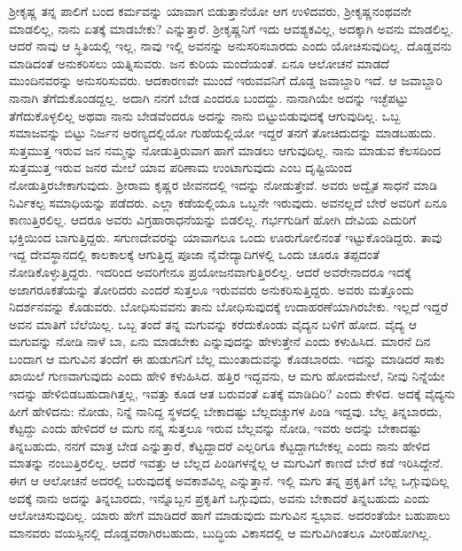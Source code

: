 ಶ‍್ರೀಕೃಷ್ಣ ತನ್ನ ಪಾಲಿಗೆ ಬಂದ ಕರ್ಮವನ್ನು ಯಾವಾಗ ಬಿಡುತ್ತಾನೆಯೋ ಆಗ ಉಳಿದವರು, ಶ‍್ರೀಕೃಷ್ಣನಂಥವನೇ ಮಾಡಲಿಲ್ಲ, ನಾನು ಏತಕ್ಕೆ ಮಾಡಬೇಕು? ಎನ್ನುತ್ತಾರೆ. ಶ‍್ರೀಕೃಷ್ಣನಿಗೆ ಇದು ಆವಶ್ಯಕವಿಲ್ಲ, ಅದಕ್ಕಾಗಿ ಅವನು ಮಾಡಲಿಲ್ಲ. ಆದರೆ ನಾವು ಆ ಸ್ಥಿತಿಯಲ್ಲಿ ಇಲ್ಲ, ನಾವು ಇಲ್ಲಿ ಅವನನ್ನು ಅನುಸರಿಸಬಾರದು ಎಂದು ಯೋಚಿಸುವುದಿಲ್ಲ. ದೊಡ್ಡವನು ಮಾಡಿದಂತೆ ಅನುಕರಿಸಲು ಯತ್ನಿಸುವರು. ಜನ ಕುರಿಯ ಮಂದೆಯಂತೆ. ಏನೂ ಆಲೋಚನೆ ಮಾಡದೆ ಮುಂದಿನವರನ್ನು ಅನುಸರಿಸುವರು. ಆದಕಾರಣವೇ ಮುಂದೆ ಇರುವವನಿಗೆ ದೊಡ್ಡ ಜವಾಬ್ದಾರಿ ಇದೆ. ಆ ಜವಾಬ್ದಾರಿ ನಾನಾಗಿ ತೆಗೆದುಕೊಂಡದ್ದಲ್ಲ. ಅದಾಗಿ ನನಗೆ ಬೇಡ ಎಂದರೂ ಬಂದದ್ದು. ನಾನಾಗಿಯೇ ಅದನ್ನು ಇಚ್ಛೆಪಟ್ಟು ತೆಗೆದುಕೊಳ್ಳಲಿಲ್ಲ ಅಥವಾ ನಾನು ಬೇಡವೆಂದರೂ ಅದನ್ನು ನಾನು ಬಿಟ್ಟುಬಿಡುವುದಕ್ಕೆ ಆಗುವುದಿಲ್ಲ. ಒಬ್ಬ ಸಮಾಜವನ್ನು ಬಿಟ್ಟು ನಿರ್ಜನ ಅರಣ್ಯದಲ್ಲಿಯೋ ಗುಹೆಯಲ್ಲಿಯೋ ಇದ್ದರೆ ತನಗೆ ತೋಚಿದುದನ್ನು ಮಾಡಬಹುದು. ಸುತ್ತಮುತ್ತ ಇರುವ ಜನ ನಮ್ಮನ್ನು ನೋಡುತ್ತಿರುವಾಗ ಹಾಗೆ ಮಾಡಲು ಆಗುವುದಿಲ್ಲ. ನಾನು ಮಾಡುವ ಕೆಲಸದಿಂದ ಸುತ್ತಮುತ್ತ ಇರುವ ಜನರ ಮೇಲೆ ಯಾವ ಪರಿಣಾಮ ಉಂಟಾಗುವುದು ಎಂಬ ದೃಷ್ಟಿಯಿಂದ ನೋಡುತ್ತಿರಬೇಕಾಗುವುದು. ಶ‍್ರೀರಾಮ ಕೃಷ್ಣರ ಜೀವನದಲ್ಲಿ ಇದನ್ನು ನೋಡುತ್ತೇವೆ. ಅವರು ಅದ್ವೈತ ಸಾಧನೆ ಮಾಡಿ ನಿರ್ವಿಕಲ್ಪ ಸಮಾಧಿಯನ್ನು ಪಡೆದರು. ಎಲ್ಲಾ ಕಡೆಯಲ್ಲಿಯೂ ಒಬ್ಬನೇ ಇರುವುದು. ಅವನಲ್ಲದೆ ಬೇರೆ ಅವರಿಗೆ ಏನೂ ಕಾಣುತ್ತಿರಲಿಲ್ಲ. ಆದರೂ ಅವರು ವಿಗ್ರಹಾರಾಧನೆಯನ್ನು ಬಿಡಲಿಲ್ಲ. ಗರ್ಭಗುಡಿಗೆ ಹೋಗಿ ದೇವಿಯ ಎದುರಿಗೆ ಭಕ್ತಿಯಿಂದ ಬಾಗುತ್ತಿದ್ದರು. ಸಗುಣದೇವರನ್ನು ಯಾವಾಗಲೂ ಒಂದು ಊರುಗೋಲಿನಂತೆ ಇಟ್ಟುಕೊಂಡಿದ್ದರು. ತಾವು ಇದ್ದ ದೇವಸ್ಥಾನದಲ್ಲಿ ಕಾಲಕಾಲಕ್ಕೆ ಆಗುತ್ತಿದ್ದ ಪೂಜಾ ನೈವೇದ್ಯಾದಿಗಳಲ್ಲಿ ಒಂದು ಚೂರೂ ತಪ್ಪದಂತೆ ನೋಡಿಕೊಳ್ಳುತ್ತಿದ್ದರು. ಇದರಿಂದ ಅವರಿಗೇನೂ ಪ್ರಯೋಜನವಾಗುತ್ತಿರಲಿಲ್ಲ. ಆದರೆ ಅವರೇನಾದರೂ ಇದಕ್ಕೆ ಅಜಾಗರೂಕತೆಯನ್ನು ತೋರಿದರು ಎಂದರೆ ಸುತ್ತಲೂ ಇರುವವರು ಅನುಕರಿಸುತ್ತಿದ್ದರು. ಅವರು ಮತ್ತೊಂದು ನಿದರ್ಶನವನ್ನು ಕೊಡುವರು. ಬೋಧಿಸುವವನು ತಾನು ಬೋಧಿಸುವುದಕ್ಕೆ ಉದಾಹರಣೆಯಾಗಿರಬೇಕು. ಇಲ್ಲದೆ ಇದ್ದರೆ ಅವನ ಮಾತಿಗೆ ಬೆಲೆಯಿಲ್ಲ. ಒಬ್ಬ ತಂದೆ ತನ್ನ ಮಗುವನ್ನು ಕರೆದುಕೊಂಡು ವೈದ್ಯನ ಬಳಿಗೆ ಹೋದ. ವೈದ್ಯ ಆ ಮಗುವನ್ನು ನೋಡಿ ನಾಳೆ ಬಾ, ಏನು ಮಾಡಬೇಕು ಎನ್ನುವುದನ್ನು ಹೇಳುತ್ತೇನೆ ಎಂದು ಕಳುಹಿಸಿದ. ಮಾರನೆ ದಿನ ಬಂದಾಗ ಆ ಮಗುವಿನ ತಂದೆಗೆ ಈ ಹುಡುಗನಿಗೆ ಬೆಲ್ಲ ಮುಂತಾದುವನ್ನು ಕೊಡಬಾರದು. ಇದನ್ನು ಮಾಡಿದರೆ ಸಾಕು ಖಾಯಿಲೆ ಗುಣವಾಗುವುದು ಎಂದು ಹೇಳಿ ಕಳುಹಿಸಿದ. ಹತ್ತಿರ ಇದ್ದವನು, ಆ ಮಗು ಹೋದಮೇಲೆ, ನೀವು ನಿನ್ನೆಯೇ ಇದನ್ನು ಹೇಳಿಬಿಡಬಹುದಾಗಿತ್ತಲ್ಲ, ಇವತ್ತು ಕೂಡ ಆತ ಬರುವಂತೆ ಏತಕ್ಕೆ ಮಾಡಿದಿರಿ? ಎಂದು ಕೇಳಿದ. ಅದಕ್ಕೆ ವೈದ್ಯನು ಹೀಗೆ ಹೇಳಿದನು: ನೋಡು, ನಿನ್ನೆ ನಾನಿದ್ದ ಸ್ಥಳದಲ್ಲಿ ಬೇಕಾದಷ್ಟು ಬೆಲ್ಲದಚ್ಚುಗಳ ಪಿಂಡಿ ಇದ್ದವು. ಬೆಲ್ಲ ತಿನ್ನಬಾರದು, ಕೆಟ್ಟದ್ದು ಎಂದು ಹೇಳಿದರೆ ಆ ಮಗು ನನ್ನ ಸುತ್ತಲೂ ಇರುವ ಬೆಲ್ಲವನ್ನು ನೋಡಿ, ಇವರು ಅದನ್ನು ಬೇಕಾದಷ್ಟು ತಿನ್ನಬಹುದು, ನನಗೆ ಮಾತ್ರ ಬೇಡ ಎನ್ನುತ್ತಾರೆ, ಕೆಟ್ಟದ್ದಾದರೆ ಎಲ್ಲರಿಗೂ ಕೆಟ್ಟದ್ದಾಗಬೇಕಲ್ಲ ಎಂದು ನಾನು ಹೇಳಿದ ಮಾತನ್ನು ನಂಬುತ್ತಿರಲಿಲ್ಲ. ಆದರೆ ಇವತ್ತು ಆ ಬೆಲ್ಲದ ಪಿಂಡಿಗಳನ್ನೆಲ್ಲ ಆ ಮಗುವಿಗೆ ಕಾಣದೆ ಬೇರೆ ಕಡೆ ಇರಿಸಿದ್ದೇನೆ. ಈಗ ಆ ಆಲೋಚನೆ ಅದರಲ್ಲಿ ಬರುವುದಕ್ಕೆ ಅವಕಾಶವಿಲ್ಲ ಎನ್ನುತ್ತಾನೆ. ಇಲ್ಲಿ ಮಗು ತನ್ನ ಪ್ರಕೃತಿಗೆ ಬೆಲ್ಲ ಒಗ್ಗುವುದಿಲ್ಲ ಅದಕ್ಕೆ ನಾನು ಅದನ್ನು ತಿನ್ನಬಾರದು, ಇನ್ನೊಬ್ಬನ ಪ್ರಕೃತಿಗೆ ಒಗ್ಗುವುದು, ಅವನು ಬೇಕಾದರೆ ತಿನ್ನಬಹುದು ಎಂದು ಆಲೋಚಿಸುವುದಿಲ್ಲ. ಯಾರು ಹೇಗೆ ಮಾಡಿದರೆ ಹಾಗೆ ಮಾಡುವುದು ಮಗುವಿನ ಸ್ವಭಾವ. ಅದರಂತೆಯೇ ಬಹುಪಾಲು ಮಾನವರು ವಯಸ್ಸಿನಲ್ಲಿ ದೊಡ್ಡವರಾಗಿರಬಹುದು, ಬುದ್ಧಿಯ ವಿಕಾಸದಲ್ಲಿ ಆ ಮಗುವಿಗಿಂತಲೂ ಮೀರಿಹೋಗಿಲ್ಲ.

